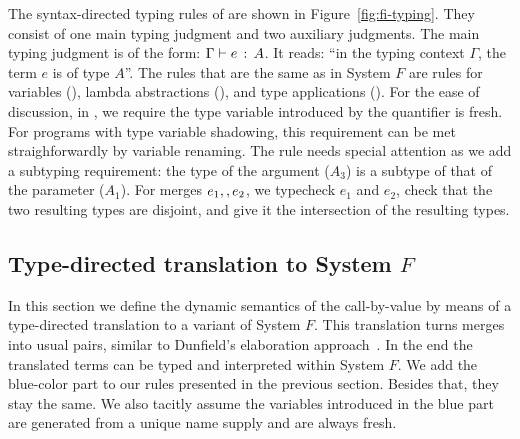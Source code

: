 The syntax-directed typing rules of \name are shown in
Figure~\ref{fig:fi-typing}. They consist of one main typing judgment and two
auxiliary judgments. The main typing judgment is of the form: $ \Gamma \vdash e \ \!:\! \ A $. It reads: ``in the typing context $\Gamma$, the term $e$ is of type
$A$''. The rules that are the same as in System $F$ are rules for variables
(), lambda abstractions (), and type applications
(). For the ease of discussion, in , we require
the type variable introduced by the quantifier is fresh. For programs with type
variable shadowing, this requirement can be met straighforwardly by variable
renaming. The rule  needs special attention as we add a subtyping
requirement: the type of the argument ($A_3$) is a subtype of that of the
parameter ($A_1$).
For merges $e_1 ,, e_2$, we typecheck $e_1$ and $e_2$, check that the two
resulting types are disjoint, and give it the intersection of the resulting
types.


\subsection{Type-directed translation to System $ F $}

In this section we define the dynamic semantics of the call-by-value \name by
means of a type-directed translation to a variant of System $F$. This
translation turns merges into usual pairs, similar to Dunfield's elaboration
approach~\cite{dunfield2014elaborating}. In the end the translated terms can be typed and interpreted
within System $F$. We add the blue-color part to our rules presented in the
previous section. Besides that, they stay the same. We also tacitly assume the
variables introduced in the blue part are generated from a unique name supply and
are always fresh.

